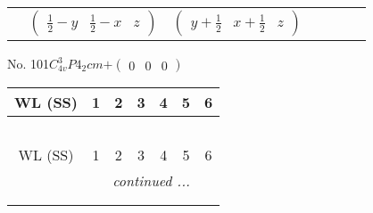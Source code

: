 \documentclass[fleqn,9pt,landscape]{jsarticle}
\begin{document}
\begin{center}
\begin{longtable}{ccccccc}
& $ \begin{pmatrix} \frac{1}{2} - y & \frac{1}{2} - x & z \end{pmatrix} $ & $ \begin{pmatrix} y + \frac{1}{2} & x + \frac{1}{2} & z \end{pmatrix} $ & $  $ & $  $ & $  $ & $  $ \\
\end{longtable}
\end{center}
\newpage
No. 101\quad$C_{4v}^{3}$\quad$P4_2cm$\quad[ tetragonal ]\quad$+\begin{pmatrix} 0 & 0 & 0 \end{pmatrix}$
\begin{center}
\renewcommand{\arraystretch}{1.2}
\begin{longtable}{ccccccc}
 \hline \hline
WL (SS) & 1 & 2 & 3 & 4 & 5 & 6 \\ \hline \endfirsthead

\multicolumn{6}{l}{\tablename\ \thetable{}} \\
 \hline \hline
WL (SS) & 1 & 2 & 3 & 4 & 5 & 6 \\ \hline \endhead

 \hline \hline
\multicolumn{6}{r}{\footnotesize\it continued ...} \\ \endfoot

 \hline \hline
\multicolumn{6}{r}{} \\ \endlastfoot


\end{longtable}
\end{center}
\end{document}
